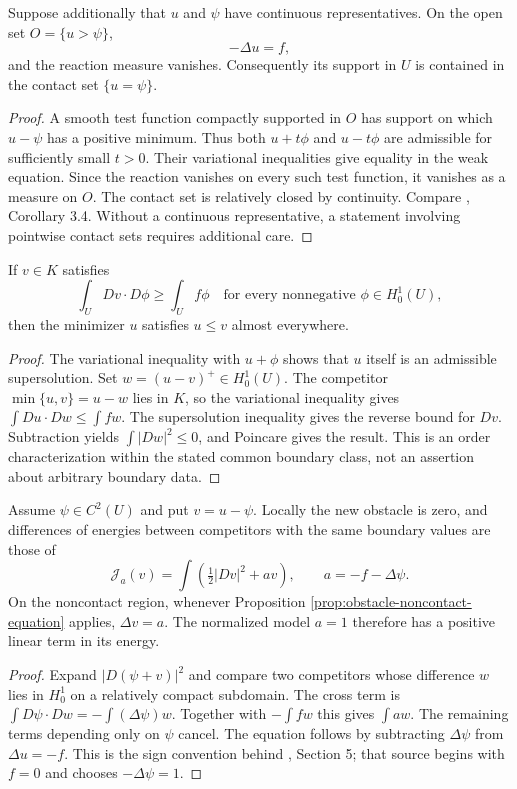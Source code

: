 \begin{proposition}\label{prop:obstacle-noncontact-equation}
Suppose additionally that $u$ and $\psi$ have continuous representatives. On the open set $O=\{u>\psi\}$,
\[
 -\Delta u=f,
\]
and the reaction measure vanishes. Consequently its support in $U$ is contained in the contact set $\{u=\psi\}$.
\end{proposition}
\begin{proof}
A smooth test function compactly supported in $O$ has support on which $u-\psi$ has a positive minimum. Thus both $u+t\phi$ and $u-t\phi$ are admissible for sufficiently small $t>0$. Their variational inequalities give equality in the weak equation. Since the reaction vanishes on every such test function, it vanishes as a measure on $O$. The contact set is relatively closed by continuity. Compare \cite{Fig18}, Corollary 3.4. Without a continuous representative, a statement involving pointwise contact sets requires additional care.
\end{proof}

\begin{proposition}\label{prop:obstacle-least-supersolution}
If $v\in K$ satisfies
\[
 \int_U Dv\cdot D\phi\geq\int_U f\phi
 \quad\text{for every nonnegative }\phi\in H^1_0(U),
\]
then the minimizer $u$ satisfies $u\leq v$ almost everywhere.
\end{proposition}
\begin{proof}
The variational inequality with $u+\phi$ shows that $u$ itself is an admissible supersolution. Set $w=(u-v)^+\in H^1_0(U)$. The competitor $\min\{u,v\}=u-w$ lies in $K$, so the variational inequality gives $\int Du\cdot Dw\leq\int fw$. The supersolution inequality gives the reverse bound for $Dv$. Subtraction yields $\int|Dw|^2\leq0$, and Poincare gives the result. This is an order characterization within the stated common boundary class, not an assertion about arbitrary boundary data.
\end{proof}

\begin{proposition}\label{prop:obstacle-normalization}
Assume $\psi\in C^2(U)$ and put $v=u-\psi$. Locally the new obstacle is zero, and differences of energies between competitors with the same boundary values are those of
\[
 \mathcal J_a(v)=\int\left(\tfrac12|Dv|^2+av\right),
 \qquad a=-f-\Delta\psi.
\]
On the noncontact region, whenever Proposition \ref{prop:obstacle-noncontact-equation} applies, $\Delta v=a$. The normalized model $a=1$ therefore has a positive linear term in its energy.
\end{proposition}
\begin{proof}
Expand $|D(\psi+v)|^2$ and compare two competitors whose difference $w$ lies in $H^1_0$ on a relatively compact subdomain. The cross term is $\int D\psi\cdot Dw=-\int(\Delta\psi)w$. Together with $-\int fw$ this gives $\int aw$. The remaining terms depending only on $\psi$ cancel. The equation follows by subtracting $\Delta\psi$ from $\Delta u=-f$. This is the sign convention behind \cite{Fig18}, Section 5; that source begins with $f=0$ and chooses $-\Delta\psi=1$.
\end{proof}
